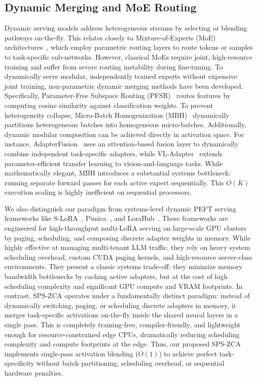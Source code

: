 \subsection{Dynamic Merging and MoE Routing}
Dynamic serving models address heterogeneous streams by selecting or blending pathways on-the-fly. This relates closely to Mixture-of-Experts (MoE) architectures~\cite{shazeer2017outrageously, fedus2022switch, riquelme2021scaling}, which employ parametric routing layers to route tokens or samples to task-specific sub-networks. However, classical MoEs require joint, high-resource training and suffer from severe routing instability during fine-tuning.
To dynamically serve modular, independently trained experts without expensive joint training, non-parametric dynamic merging methods have been developed. Specifically, Parameter-Free Subspace Routing (PFSR)~\cite{pfsr2025} routes features by computing cosine similarity against classification weights. To prevent heterogeneity collapse, Micro-Batch Homogenization (MBH)~\cite{mbh2025} dynamically partitions heterogeneous batches into homogeneous micro-batches.
Additionally, dynamic modular composition can be achieved directly in activation space. For instance, AdapterFusion~\cite{pfeiffer2020adapterfusion} uses an attention-based fusion layer to dynamically combine independent task-specific adapters, while VL-Adapter~\cite{sung2022vl-adapter} extends parameter-efficient transfer learning to vision-and-language tasks.
While mathematically elegant, MBH introduces a substantial systems bottleneck: running separate forward passes for each active expert sequentially. This $O(K)$ execution scaling is highly inefficient on sequential processors. 

We also distinguish our paradigm from systems-level dynamic PEFT serving frameworks like S-LoRA~\cite{sheng2023slora}, Punica~\cite{chen2023punica}, and LoraHub~\cite{huang2024lorahub}. These frameworks are engineered for high-throughput multi-LoRA serving on large-scale GPU clusters by paging, scheduling, and composing discrete adapter weights in memory. While highly effective at managing multi-tenant LLM traffic, they rely on heavy system scheduling overhead, custom CUDA paging kernels, and high-resource server-class environments. They present a classic systems trade-off: they minimize memory bandwidth bottlenecks by caching active adapters, but at the cost of high scheduling complexity and significant GPU compute and VRAM footprints. In contrast, SPS-ZCA operates under a fundamentally distinct paradigm: instead of dynamically switching, paging, or scheduling discrete adapters in memory, it merges task-specific activations on-the-fly inside the shared neural layers in a single pass. This is completely training-free, compiler-friendly, and lightweight enough for resource-constrained edge CPUs, dramatically reducing scheduling complexity and compute footprints at the edge. Thus, our proposed SPS-ZCA implements single-pass activation blending ($O(1)$) to achieve perfect task-specificity without batch partitioning, scheduling overhead, or sequential hardware penalties.

